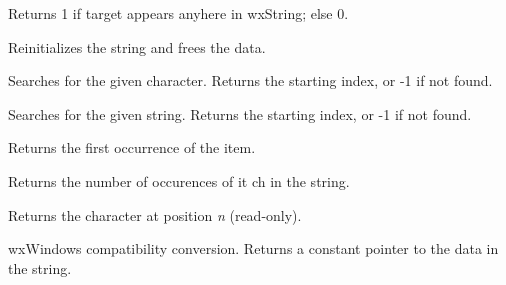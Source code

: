 \label{wxstringcontains}


Returns 1 if target appears anyhere in wxString; else 0.

\label{wxstringempty}


Reinitializes the string and frees the data.

\label{wxstringfind}


Searches for the given character. Returns the starting index, or -1 if not found.


Searches for the given string. Returns the starting index, or -1 if not found.

\label{wxstringfirst}





Returns the first occurrence of the item.

\label{wxstringfreq}


Returns the number of occurences of {it ch} in the string.

\label{wxstringgetchar}


Returns the character at position {\it n} (read-only).

\label{wxstringgetdata}


wxWindows compatibility conversion. Returns a constant pointer to the data in the string.

\label{wxstringgetwritablechar}

